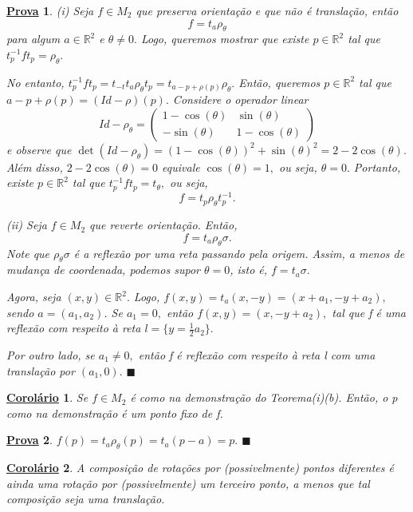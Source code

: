 \documentclass{article}
\newtheorem*{crl*}{\underline{Corol\'ario}}
\newtheorem*{proof*}{\underline{Prova}}
\renewcommand\qedsymbol{$\blacksquare$}
\begin{document}
\begin{proof*}
  (i) Seja $f\in M_{2}$ que preserva orientação e que não é translação, então 
    $$
      f = t_{a}\rho_{\theta }
    $$
    para algum $a\in \mathbb{R}^{2}$ e $\theta \neq0.$ Logo, queremos mostrar que existe $p\in \mathbb{R}^{2}$
    tal que $t_{p}^{-1}ft_{p}=\rho_{\theta }.$

    No entanto, $t_{p}^{-1}ft_{p}=t_{-t}t_{a}\rho _{\theta }t_{p} = t_{a-p+\rho (p)}\rho _{\theta }.$
Então, queremos $p\in \mathbb{R}^{2}$ tal que $a - p + \rho (p) = (Id - \rho )(p).$ Considere o operador linear 
  $$
    Id - \rho _{\theta } = \begin{pmatrix}
      1 - \cos{(\theta )} & \sin{(\theta )}\\
      -\sin{(\theta )} & 1-\cos{(\theta )}
    \end{pmatrix}
  $$
  e observe que $\det{(Id-\rho _{\theta })} = (1-\cos{(\theta )})^{2} +\sin{(\theta )}^{2} = 2-2\cos{(\theta )}.$
  Além disso, $2-2\cos{(\theta )} = 0$ equivale $\cos{(\theta )}=1,$ ou seja, $\theta =0.$ Portanto, existe
  $p\in \mathbb{R}^{2}$ tal que $t_{p}^{-1}ft_{p}=t_{\theta },$ ou seja, 
    $$
      f = t_{p}\rho _{\theta }t_{p}^{-1}.
    $$ 

  (ii) Seja $f\in M_{2}$ que reverte orientação. Então, 
    $$
      f = t_a\rho _{\theta }\sigma.
    $$ 
    Note que $\rho _{\theta }\sigma $ é a reflexão por uma reta passando pela origem. Assim, a menos de mudança de coordenada,
    podemos supor $\theta =0$, isto é, $f = t_{a}\sigma .$

    Agora, seja $(x, y)\in \mathbb{R}^{2}.$ Logo, $f(x,y) = t_{a}(x, -y)=(x+a_{1}, -y+a_{2}),$ sendo $a = (a_{1}, a_{2})$.
    Se $a_{1}=0,$ então $f(x, y) = (x, -y+a_{2}),$ tal que f é uma reflexão com respeito à reta $l=\{y=\frac{1}{2}a_{2}\}.$

    Por outro lado, se $a_{1}\neq0,$ então f é reflexão com respeito à reta l com uma translação por $(a_{1}, 0).$ \qedsymbol
\end{proof*}
\begin{crl*}
  Se $f\in M_{2}$ é como na demonstração do Teorema(i)(b). Então, o p como na demonstração é um ponto fixo de f.
\end{crl*}
\begin{proof*}
  $f(p)=t_{a}\rho _{\theta }(p) = t_{a}(p-a) = p.$ \qedsymbol
\end{proof*}
\begin{crl*}
  A composição de rotações por (possivelmente) pontos diferentes é ainda uma rotação por (possivelmente) um terceiro ponto,
a menos que tal composição seja uma translação.
\end{crl*}
\end{document}
